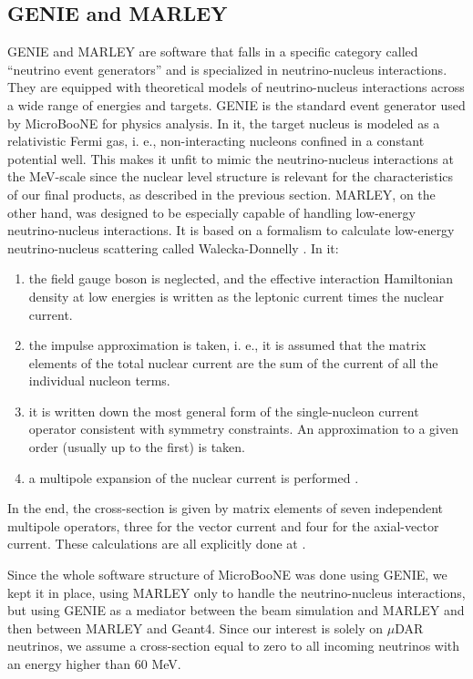 \subsection{GENIE and MARLEY}
GENIE and MARLEY are software that falls in a specific category called ``neutrino event generators” and is specialized in neutrino-nucleus interactions. They are equipped with theoretical models of neutrino-nucleus interactions across a wide range of energies and targets. 
GENIE is the standard event generator used by MicroBooNE for physics analysis. In it, the target nucleus is modeled as a relativistic Fermi gas, i. e., non-interacting nucleons confined in a constant potential well. This makes it unfit to mimic the neutrino-nucleus interactions at the MeV-scale since the nuclear level structure is relevant for the characteristics of our final products, as described in the previous section. 
MARLEY, on the other hand, was designed to be especially capable of handling low-energy neutrino-nucleus interactions. It is based on a formalism to calculate low-energy neutrino-nucleus scattering called Walecka-Donnelly \cite{Walecka-Donnelly}. In it:
\begin{enumerate}
 \item the field gauge boson is neglected, and the effective interaction Hamiltonian density at low energies is written as the leptonic current times the nuclear current.
 \item the impulse approximation is taken, i. e., it is assumed that the matrix elements of the total nuclear current are the sum of the current of all the individual nucleon terms.
 \item it is written down the most general form of the single-nucleon current operator consistent with symmetry constraints. An approximation to a given order (usually up to the first) is taken.
 \item a multipole expansion of the nuclear current is performed \cite{Gardiner_thesis}. 
\end{enumerate}

In the end, the cross-section is given by matrix elements of seven independent multipole operators, three for the vector current and four for the axial-vector current. These calculations are all explicitly done at \cite{Gardiner_thesis}.

Since the whole software structure of MicroBooNE was done using GENIE, we kept it in place, using MARLEY only to handle the neutrino-nucleus interactions, but using GENIE as a mediator between the beam simulation and MARLEY and then between MARLEY and Geant4. Since our interest is solely on $\mu$DAR neutrinos, we assume a cross-section equal to zero to all incoming neutrinos with an energy higher than $60$ MeV. 

